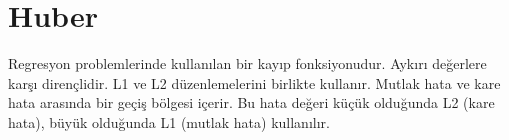 \section{Huber}
Regresyon problemlerinde kullanılan bir kayıp fonksiyonudur. Aykırı değerlere karşı dirençlidir. L1 ve L2 düzenlemelerini birlikte kullanır. Mutlak hata ve kare hata arasında bir geçiş bölgesi içerir. Bu hata değeri küçük olduğunda L2 (kare hata), büyük olduğunda L1 (mutlak hata) kullanılır.

\newpage